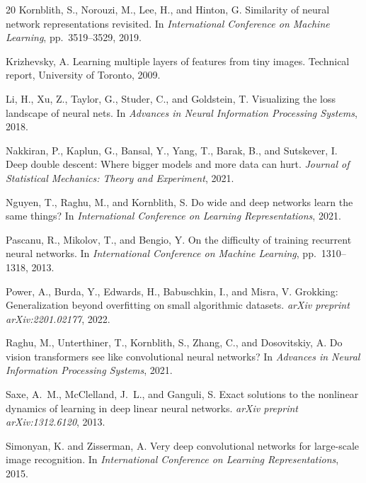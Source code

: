 \documentclass{article}
\begin{document}
\begin{thebibliography}{20}
Kornblith, S., Norouzi, M., Lee, H., and Hinton, G.
\newblock Similarity of neural network representations revisited.
\newblock In \emph{International Conference on Machine Learning}, pp.\ 3519--3529, 2019.

Krizhevsky, A.
\newblock Learning multiple layers of features from tiny images.
\newblock Technical report, University of Toronto, 2009.

Li, H., Xu, Z., Taylor, G., Studer, C., and Goldstein, T.
\newblock Visualizing the loss landscape of neural nets.
\newblock In \emph{Advances in Neural Information Processing Systems}, 2018.

Nakkiran, P., Kaplun, G., Bansal, Y., Yang, T., Barak, B., and Sutskever, I.
\newblock Deep double descent: Where bigger models and more data can hurt.
\newblock \emph{Journal of Statistical Mechanics: Theory and Experiment}, 2021.

Nguyen, T., Raghu, M., and Kornblith, S.
\newblock Do wide and deep networks learn the same things?
\newblock In \emph{International Conference on Learning Representations}, 2021.

Pascanu, R., Mikolov, T., and Bengio, Y.
\newblock On the difficulty of training recurrent neural networks.
\newblock In \emph{International Conference on Machine Learning}, pp.\ 1310--1318, 2013.

Power, A., Burda, Y., Edwards, H., Babuschkin, I., and Misra, V.
\newblock Grokking: Generalization beyond overfitting on small algorithmic datasets.
\newblock \emph{arXiv preprint arXiv:2201.02177}, 2022.

Raghu, M., Unterthiner, T., Kornblith, S., Zhang, C., and Dosovitskiy, A.
\newblock Do vision transformers see like convolutional neural networks?
\newblock In \emph{Advances in Neural Information Processing Systems}, 2021.

Saxe, A.~M., McClelland, J.~L., and Ganguli, S.
\newblock Exact solutions to the nonlinear dynamics of learning in deep linear neural networks.
\newblock \emph{arXiv preprint arXiv:1312.6120}, 2013.

Simonyan, K. and Zisserman, A.
\newblock Very deep convolutional networks for large-scale image recognition.
\newblock In \emph{International Conference on Learning Representations}, 2015.


\end{thebibliography}
\end{document}
